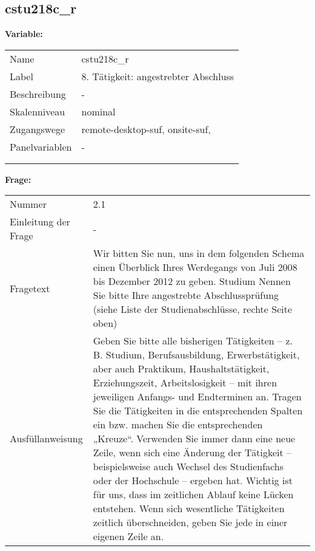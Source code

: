 	
	
	\subsection{cstu218c\_r}
	\label{subSection:cstu218c_r}

	\noindent\textbf{Variable:}\\
		\begin{tabular}{lL{11.3cm}}
			\label{tableVariable:cstu218c_r}
			Name & cstu218c\_r \\
			Label & 8. Tätigkeit: angestrebter Abschluss \\
			Beschreibung & - \\
			Skalenniveau & nominal \\
			Zugangswege &
				remote-desktop-suf,
				onsite-suf,
 \\
			Panelvariablen & -
			 \\
			 \\
 \\
		\end{tabular}

		\vspace*{1 cm}
		\noindent\textbf{Frage:}\\
		\begin{tabular}{lL{11.3cm}}
			\label{tableQuestion:cstu218c_r}
			Nummer & 2.1 \\
			Einleitung der Frage & - \\
			Fragetext & Wir bitten Sie nun, uns in dem folgenden Schema einen Überblick Ihres Werdegangs von Juli 2008 bis Dezember 2012 zu geben.
Studium
Nennen Sie bitte Ihre angestrebte Abschlussprüfung 
(siehe Liste der Studienabschlüsse, rechte Seite oben) \\
			Ausfüllanweisung & Geben Sie bitte alle bisherigen Tätigkeiten – z. B. Studium, Berufsausbildung, Erwerbstätigkeit, aber auch Praktikum, Haushaltstätigkeit,
Erziehungszeit, Arbeitslosigkeit – mit ihren jeweiligen Anfangs- und Endterminen an. Tragen Sie die Tätigkeiten in die entsprechenden Spalten ein bzw. machen Sie die entsprechenden „Kreuze“. Verwenden Sie immer dann eine neue Zeile, wenn sich eine Änderung der Tätigkeit – beispielsweise auch Wechsel des Studienfachs oder der Hochschule – ergeben hat. Wichtig ist für uns, dass im zeitlichen Ablauf keine Lücken entstehen. Wenn sich wesentliche Tätigkeiten zeitlich überschneiden, geben Sie jede in einer eigenen Zeile an. \\
		\end{tabular}





